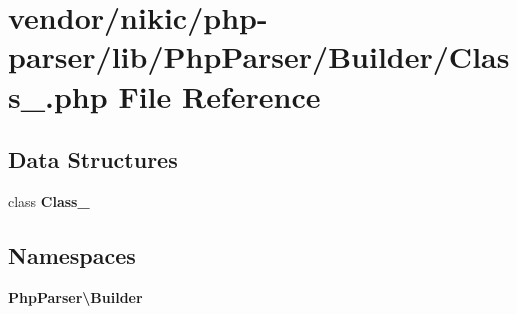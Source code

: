 \section{vendor/nikic/php-\/parser/lib/\+Php\+Parser/\+Builder/\+Class\+\_\+.php File Reference}
\label{_builder_2_class___8php}
\subsection*{Data Structures}
\begin{DoxyCompactItemize}
\item 
class {\bf Class\+\_\+}
\end{DoxyCompactItemize}
\subsection*{Namespaces}
\begin{DoxyCompactItemize}
\item 
 {\bf Php\+Parser\textbackslash{}\+Builder}
\end{DoxyCompactItemize}
